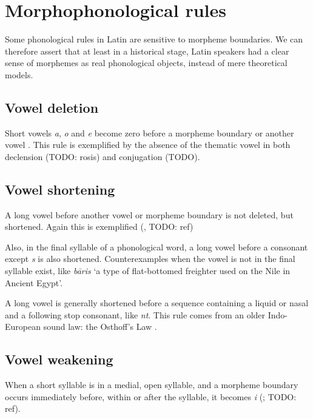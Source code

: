 \documentclass[a4paper, oneside, 12pt]{report}
\newcommand*{\citesec}[1]{\S~{#1}}
\newcommand*{\citepage}[1]{p.~{#1}}
\newcommand{\form}[1]{\emph{#1}}
\newcommand{\translate}[1]{`#1'}
\begin{document}
\section{Morphophonological rules}\label{sec:phonology.morphological}

Some phonological rules in Latin are sensitive to morpheme boundaries.
We can therefore assert that at least in a historical stage, 
Latin speakers had a clear sense of morphemes 
as real phonological objects,
instead of mere theoretical models.


\subsection{Vowel deletion}\label{sec:phonology.rule.deletion}

Short vowels \form{a}, \form{o} and \form{e} 
become zero before a morpheme boundary or another vowel
\citep[\citesec{8.3}]{oniga2014latin}.
This rule is exemplified by the absence 
of the thematic vowel in both declension (TODO: rosis)
and conjugation (TODO).

\subsection{Vowel shortening}\label{sec:phonology.rule.shortening}

A long vowel before another vowel or morpheme boundary 
is not deleted, but shortened.
Again this is exemplified (, TODO: ref)

Also, in the final syllable of a phonological word,
a long vowel before a consonant except \form{s} is also shortened.
Counterexamples when the vowel is not in the final syllable exist,
like \form{b\={a}ris} \translate{a type of flat-bottomed freighter used on the Nile in Ancient Egypt}.

A long vowel is generally shortened before a sequence 
containing a liquid or nasal and a following stop consonant,
like \form{nt}.
This rule comes from an older Indo-European sound law: 
the Osthoff's Law
\citep[\citepage{55}]{oniga2014latin}.

\subsection{Vowel weakening}

When a short syllable is in a medial, open syllable,
and a morpheme boundary occurs immediately before, within or after the syllable,
it becomes \form{i} 
(\citealt[\citepage{55}]{oniga2014latin}; TODO: ref).
\end{document}
